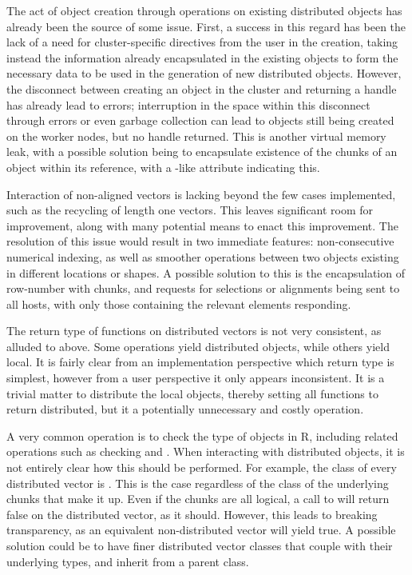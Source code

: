 The act of object creation through operations on existing distributed objects has already been the source of some issue.
First, a success in this regard has been the lack of a need for cluster-specific directives from the user in the creation, taking instead the information already encapsulated in the existing objects to form the necessary data to be used in the generation of new distributed objects.
However, the disconnect between creating an object in the cluster and returning a handle has already lead to errors; interruption in the space within this disconnect through errors or even garbage collection can lead to objects still being created on the worker nodes, but no handle returned.
This is another virtual memory leak, with a possible solution being to encapsulate existence of the chunks of an object within its reference, with a -like  attribute indicating this.

Interaction of non-aligned vectors is lacking beyond the few cases implemented, such as the recycling of length one vectors.
This leaves significant room for improvement, along with many potential means to enact this improvement.
The resolution of this issue would result in two immediate features: non-consecutive numerical indexing, as well as smoother operations between two objects existing in different locations or shapes.
A possible solution to this is the encapsulation of row-number with chunks, and requests for selections or alignments being sent to all hosts, with only those containing the relevant elements responding.

The return type of functions on distributed vectors is not very consistent, as alluded to above.
Some operations yield distributed objects, while others yield local.
It is fairly clear from an implementation perspective which return type is simplest, however from a user perspective it only appears inconsistent.
It is a trivial matter to distribute the local objects, thereby setting all functions to return distributed, but it a potentially unnecessary and costly operation.

A very common operation is to check the type of objects in R, including related operations such as checking  and .
When interacting with distributed objects, it is not entirely clear how this should be performed.
For example, the class of every distributed vector is .
This is the case regardless of the class of the underlying chunks that make it up.
Even if the chunks are all logical, a call to  will return false on the distributed vector, as it should.
However, this leads to breaking transparency, as an equivalent non-distributed vector will yield true.
A possible solution could be to have finer distributed vector classes that couple with their underlying types, and inherit from a parent  class.


